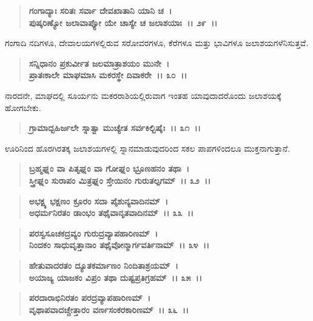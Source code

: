 \begin{verse}
\textbf{ಗಂಗಾದ್ಯಾಃ ಸರಿತಃ ಸರ್ವಾ ದೇವಖಾತಾನಿ ಯಾನಿ ಚ~।}\\\textbf{ಪುಷ್ಕರಿಣ್ಯೋ ಜಲಾವಾಪ್ಯೋ ಯೇ ಚಾಸ್ಯೇ ಚ ಜಲಾಶಯಾಃ~।। ೨೯~।।}
\end{verse}

ಗಂಗಾದಿ ನದಿಗಳೂ, ದೇವಾಲಯಗಳಲ್ಲಿರುವ ಸರೋವರಗಳೂ, ಕೆರೆಗಳೂ ಮತ್ತು ಭಾವಿಗಳೂ ಜಲಾಶಯಗಳೆನಿಸುತ್ತವೆ.

\begin{verse}
\textbf{ಸನ್ನಿಧಾನಂ ಪ್ರಕುರ್ವೀತ ಜಲಮಾತ್ರಾಶಯಂ ಮುನೇ~।}\\\textbf{ಪ್ರಾತಃಕಾಲೇ ಮಾಘಮಾಸಿ ಮಕರಸ್ಥೇ ದಿವಾಕರೇ~।। ೩೦~।।}
\end{verse}

ನಾರದನೇ, ಮಾಘದಲ್ಲಿ ಸೂರ್ಯನು ಮಕರರಾಶಿಯಲ್ಲಿರುವಾಗ ಇಂತಹ ಯಾವುದಾದರೊಂದು ಜಲಾಶಯಕ್ಕೆ ಹೋಗಬೇಕು.

\begin{verse}
\textbf{ಗ್ರಾಮಾದ್ಬಹಿರ್ಜಲೇ ಸ್ನಾತ್ವಾ ಮುಚ್ಯೇತ ಸರ್ವಕಿಲ್ಬಿಷೈಃ~।। ೩೧~।।}
\end{verse}

ಊರಿನಿಂದ ಹೊರಗಿರತಕ್ಕ ಜಲಾಶಯಗಳಲ್ಲಿ ಸ್ನಾನಮಾಡುವುದರಿಂದ ಸಕಲ ಪಾಪಗಳಿಂದಲೂ ಮುಕ್ತನಾಗುತ್ತಾನೆ.

\begin{verse}
\textbf{ಬ್ರಹ್ಮಘ್ನಂ ವಾ ಪಿತೃಘ್ನಂ ವಾ ಗೋಘ್ನಂ ಭ್ರೂಣಹನಂ ತಥಾ~।}\\\textbf{ಸ್ತ್ರೀಘ್ನಂ ಸುರಾಪಂ ಮಿತ್ರಘ್ನಂ ಸ್ತೇಯಿನಂ ಗುರುತಲ್ಪಗಮ್~।। ೩೨~।।}
\end{verse}

\begin{verse}
\textbf{ಅಭಕ್ಷ್ಯ ಭಕ್ಷಣಂ ಕ್ರೂರಂ ಸದಾ ಪೈಶುನ್ಯವಾದಿನಮ್~।}\\\textbf{ಅಧರ್ಮನಿರತಂ ಡಾಂಭಂ ತಥೈವಾನೃತವಾದಿನಮ್~।। ೩೩~।।}
\end{verse}

\begin{verse}
\textbf{ಪರಸ್ವಸೂಚಕದ್ರವ್ಯಂ ಗುರುದ್ರವ್ಯಾಪಹಾರಿಣಮ್~।}\\\textbf{ನಿಂದಕಂ ಸಾಧುವೃತ್ತಾನಾಂ ತಥೈವೋನ್ಮಾರ್ಗವರ್ತಿನಾಮ್~।। ೩೪~।।}
\end{verse}

\begin{verse}
\textbf{ಹೇತುವಾದರತಂ ದ್ಯೂತಕರ್ಮಾಣಂ ನಿಂದಿತಾಶ್ರಯಮ್~।}\\\textbf{ಅಯಾಜ್ಯ ಯಾಜಕಂ ವಿಪ್ರಂ ತಥಾ ದುಷ್ಟಪ್ರತಿಗ್ರಹಮ್~।। ೩೫~।।}
\end{verse}

\begin{verse}
\textbf{ಪರದಾರಾಭಿನಿರತಂ ಪರದ್ರವ್ಯಾಪಹಾರಿಣಮ್~।}\\\textbf{ವೃಥಾಪವಾದಚ್ಚೇತ್ತಾರಂ ವರ್ಣಸಂಕರಕಾರಿಣಮ್~।। ೩೬~।।}
\end{verse}

